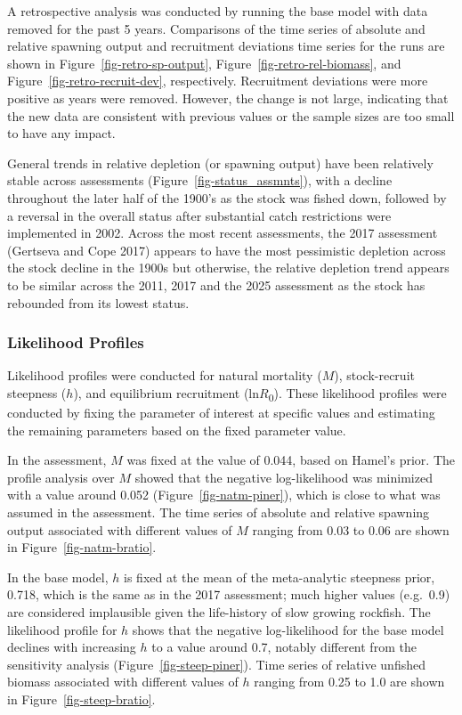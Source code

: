 \documentclass[
]{scrartcl}
\begin{document}
A retrospective analysis was conducted by running the base model with
data removed for the past 5 years. Comparisons of the time series of
absolute and relative spawning output and recruitment deviations time
series for the runs are shown in Figure~\ref{fig-retro-sp-output},
Figure~\ref{fig-retro-rel-biomass}, and
Figure~\ref{fig-retro-recruit-dev}, respectively. Recruitment deviations
were more positive as years were removed. However, the change is not
large, indicating that the new data are consistent with previous values
or the sample sizes are too small to have any impact.

General trends in relative depletion (or spawning output) have been
relatively stable across assessments (Figure~\ref{fig-status_assmnts}),
with a decline throughout the later half of the 1900's as the stock was
fished down, followed by a reversal in the overall status after
substantial catch restrictions were implemented in 2002. Across the most
recent assessments, the 2017 assessment (Gertseva and Cope 2017) appears
to have the most pessimistic depletion across the stock decline in the
1900s but otherwise, the relative depletion trend appears to be similar
across the 2011, 2017 and the 2025 assessment as the stock has rebounded
from its lowest status.

\subsubsection{Likelihood Profiles}\label{likelihood-profiles}

Likelihood profiles were conducted for natural mortality (\(M\)),
stock-recruit steepness (\(h\)), and equilibrium recruitment
(ln\(R\)\textsubscript{0}). These likelihood profiles were conducted by
fixing the parameter of interest at specific values and estimating the
remaining parameters based on the fixed parameter value.

In the assessment, \(M\) was fixed at the value of 0.044, based on
Hamel's prior. The profile analysis over \(M\) showed that the negative
log-likelihood was minimized with a value around 0.052
(Figure~\ref{fig-natm-piner}), which is close to what was assumed in the
assessment. The time series of absolute and relative spawning output
associated with different values of \(M\) ranging from 0.03 to 0.06 are
shown in Figure~\ref{fig-natm-bratio}.

In the base model, \(h\) is fixed at the mean of the meta-analytic
steepness prior, 0.718, which is the same as in the 2017 assessment;
much higher values (e.g.~0.9) are considered implausible given the
life-history of slow growing rockfish. The likelihood profile for \(h\)
shows that the negative log-likelihood for the base model declines with
increasing \(h\) to a value around 0.7, notably different from the
sensitivity analysis (Figure~\ref{fig-steep-piner}). Time series of
relative unfished biomass associated with different values of \(h\)
ranging from 0.25 to 1.0 are shown in Figure~\ref{fig-steep-bratio}.
\end{document}
